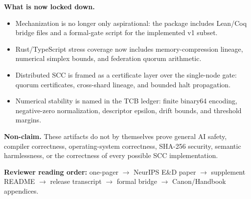 \documentclass[10pt]{article}
\begin{document}
\textbf{What is now locked down.}
\begin{itemize}[leftmargin=1.2em,itemsep=1pt,topsep=2pt]
  \item Mechanization is no longer only aspirational: the package includes Lean/Coq bridge files and a formal-gate script for the implemented v1 subset.
  \item Rust/TypeScript stress coverage now includes memory-compression lineage, numerical simplex bounds, and federation quorum arithmetic.
  \item Distributed SCC is framed as a certificate layer over the single-node gate: quorum certificates, cross-shard lineage, and bounded halt propagation.
  \item Numerical stability is named in the TCB ledger: finite binary64 encoding, negative-zero normalization, descriptor epsilon, drift bounds, and threshold margins.
\end{itemize}

\textbf{Non-claim.} These artifacts do not by themselves prove general AI safety, compiler correctness, operating-system correctness, SHA-256 security, semantic harmlessness, or the correctness of every possible SCC implementation.

\vfill
{\small\textbf{Reviewer reading order:} one-pager $\rightarrow$ NeurIPS E\&D paper $\rightarrow$ supplement README $\rightarrow$ release transcript $\rightarrow$ formal bridge $\rightarrow$ Canon/Handbook appendices.}
\end{document}
